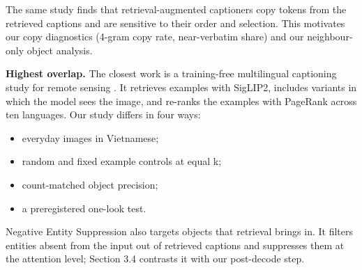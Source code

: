 The same study \citep{Li2024RetrievalRobustness} finds that retrieval-augmented captioners copy
tokens from the retrieved captions and are sensitive to their order and selection. This motivates
our copy diagnostics (4-gram copy rate, near-verbatim share) and our neighbour-only object analysis.

\textbf{Highest overlap.} The closest work is a training-free multilingual captioning study for
remote sensing \citep{Rebelo2025RSCap}. It retrieves examples with SigLIP2, includes variants in
which the model sees the image, and re-ranks the examples with PageRank across ten languages. Our
study differs in four ways:

\begin{itemize}
\tightlist
\item
  everyday images in Vietnamese;
\item
  random and fixed example controls at equal k;
\item
  count-matched object precision;
\item
  a preregistered one-look test.
\end{itemize}

Negative Entity Suppression \citep{Lu2025NES} also targets objects that retrieval brings in. It
filters entities absent from the input out of retrieved captions and suppresses them at the
attention level; Section 3.4 contrasts it with our post-decode step.

